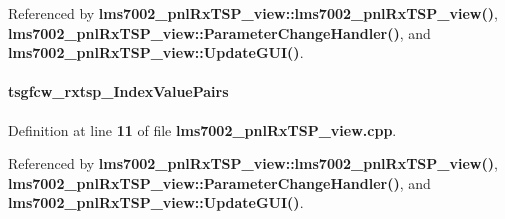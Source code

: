 Referenced by {\bf lms7002\+\_\+pnl\+Rx\+T\+S\+P\+\_\+view\+::lms7002\+\_\+pnl\+Rx\+T\+S\+P\+\_\+view()}, {\bf lms7002\+\_\+pnl\+Rx\+T\+S\+P\+\_\+view\+::\+Parameter\+Change\+Handler()}, and {\bf lms7002\+\_\+pnl\+Rx\+T\+S\+P\+\_\+view\+::\+Update\+G\+U\+I()}.

\paragraph[{tsgfcw\+\_\+rxtsp\+\_\+\+Index\+Value\+Pairs}]{ tsgfcw\+\_\+rxtsp\+\_\+\+Index\+Value\+Pairs\hspace{0.3cm}{\ttfamily [static]}}\label{lms7002__pnlRxTSP__view_8cpp_a63dc5062b13553e4d7253f7c05f12ea5}


Definition at line {\bf 11} of file {\bf lms7002\+\_\+pnl\+Rx\+T\+S\+P\+\_\+view.\+cpp}.



Referenced by {\bf lms7002\+\_\+pnl\+Rx\+T\+S\+P\+\_\+view\+::lms7002\+\_\+pnl\+Rx\+T\+S\+P\+\_\+view()}, {\bf lms7002\+\_\+pnl\+Rx\+T\+S\+P\+\_\+view\+::\+Parameter\+Change\+Handler()}, and {\bf lms7002\+\_\+pnl\+Rx\+T\+S\+P\+\_\+view\+::\+Update\+G\+U\+I()}.

